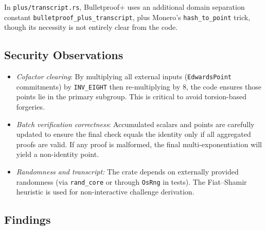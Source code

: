 \documentclass[12pt,a4paper]{article}
\begin{document}
In \texttt{plus/transcript.rs}, Bulletproof+ uses an additional domain separation constant \verb|bulletproof_plus_transcript|, plus Monero's \texttt{hash\_to\_point} trick, though its necessity is not entirely clear from the code.

\subsection{Security Observations}
\begin{itemize}
    \item \emph{Cofactor clearing}: By multiplying all external inputs (\texttt{EdwardsPoint} commitments) by \texttt{INV\_EIGHT} then re-multiplying by 8, the code ensures those points lie in the primary subgroup.  This is critical to avoid torsion-based forgeries. %
    \item \emph{Batch verification correctness}: Accumulated scalars and points are carefully updated to ensure the final check equals the identity only if all aggregated proofs are valid.  If any proof is malformed, the final multi-exponentiation will yield a non-identity point. %
    \item \emph{Randomness and transcript:} The crate depends on externally provided randomness (via \texttt{rand\_core} or through \texttt{OsRng} in tests).  The Fiat--Shamir heuristic is used for non-interactive challenge derivation. %
\end{itemize}

\subsection{Findings}
\end{document}
